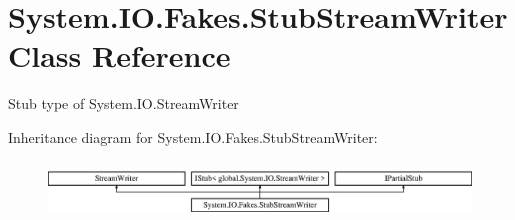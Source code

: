 \hypertarget{class_system_1_1_i_o_1_1_fakes_1_1_stub_stream_writer}{\section{System.\-I\-O.\-Fakes.\-Stub\-Stream\-Writer Class Reference}
\label{class_system_1_1_i_o_1_1_fakes_1_1_stub_stream_writer}
}


Stub type of System.\-I\-O.\-Stream\-Writer 


Inheritance diagram for System.\-I\-O.\-Fakes.\-Stub\-Stream\-Writer\-:\begin{figure}[H]
\begin{center}
\leavevmode
\includegraphics[height=1.530055cm]{class_system_1_1_i_o_1_1_fakes_1_1_stub_stream_writer}
\end{center}
\end{figure}
